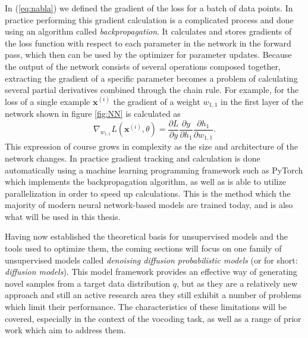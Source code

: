 \documentclass{article}
\begin{document}
In (\ref{eq:nabla}) we defined the gradient of the loss for a batch of data points. In practice performing this gradient calculation is a complicated process and done using an algorithm called \textit{backpropagation}. It calculates and stores gradients of the loss function with respect to each parameter in the network in the forward pass, which then can be used by the optimizer for parameter updates. Because the output of the network consists of several operations composed together, extracting the gradient of a specific parameter becomes a problem of calculating several partial derivatives combined through the chain rule. For example, for the loss of a single example $\bm{x}^{(i)}$ the gradient of a weight $w_{1,1}$ in the first layer of the network shown in figure \ref{fig:NN} is calculated as
\begin{equation}
    \nabla_{w_{1,1}} L(\bm{x}^{(i)}, \theta) = \frac{\partial L}{\partial y} \frac{\partial y}{\partial h_1} \frac{\partial h_1}{\partial w_{1,1}}.
\end{equation}
This expression of course grows in complexity as the size and architecture of the network changes. In practice gradient tracking and calculation is done automatically using a machine learning programming framework such as PyTorch \cite{paszke2019pytorch} which implements the backpropagation algorithm, as well as is able to utilize parallelization in order to speed up calculations. This is the method which the majority of modern neural network-based models are trained today, and is also what will be used in this thesis.

Having now established the theoretical basis for unsupervised models and the tools used to optimize them, the coming sections will focus on one family of unsupervised models called \textit{denoising diffusion probabilistic models} (or for short: \textit{diffusion models}). This model framework provides an effective way of generating novel samples from a target data distribution $q$, but as they are a relatively new approach and still an active research area they still exhibit a number of problems which limit their performance. The characteristics of these limitations will be covered, especially in the context of the vocoding task, as well as a range of prior work which aim to address them.
\end{document}
